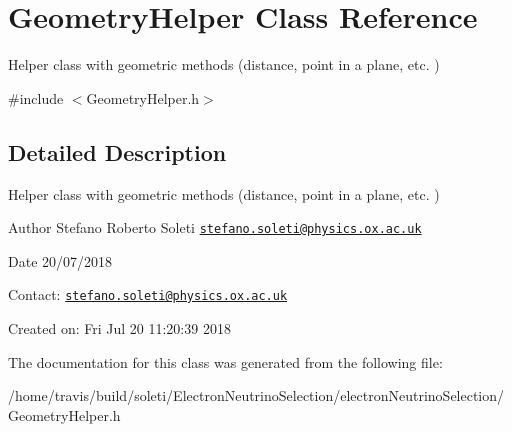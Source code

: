 \hypertarget{classGeometryHelper}{\section{Geometry\-Helper Class Reference}
\label{classGeometryHelper}
}


Helper class with geometric methods (distance, point in a plane, etc. )  




{\ttfamily \#include $<$Geometry\-Helper.\-h$>$}



\subsection{Detailed Description}
Helper class with geometric methods (distance, point in a plane, etc. ) 

\begin{DoxyAuthor}{Author}
Stefano Roberto Soleti \href{mailto:stefano.soleti@physics.ox.ac.uk}{\tt stefano.\-soleti@physics.\-ox.\-ac.\-uk}
\end{DoxyAuthor}
\begin{DoxyDate}{Date}
20/07/2018
\end{DoxyDate}
Contact\-: \href{mailto:stefano.soleti@physics.ox.ac.uk}{\tt stefano.\-soleti@physics.\-ox.\-ac.\-uk}

Created on\-: Fri Jul 20 11\-:20\-:39 2018 

The documentation for this class was generated from the following file\-:\begin{DoxyCompactItemize}
\item 
/home/travis/build/soleti/\-Electron\-Neutrino\-Selection/electron\-Neutrino\-Selection/Geometry\-Helper.\-h\end{DoxyCompactItemize}
